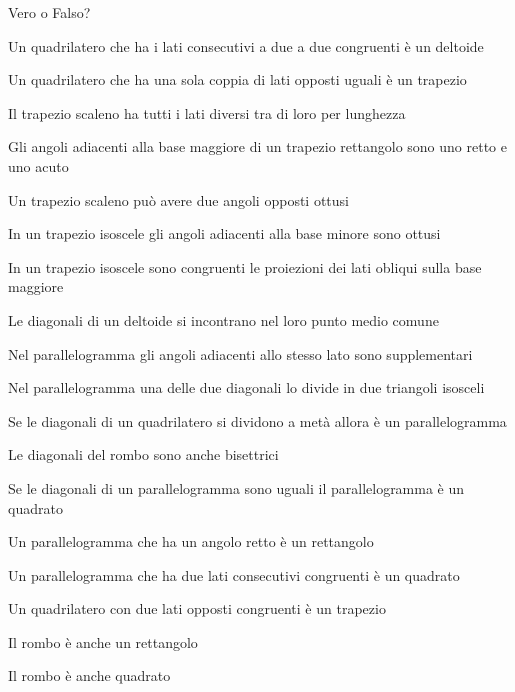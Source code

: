 \begin{esercizio}
\label{ese:4.2}
Vero o Falso?
\begin{enumeratea}
\item Un quadrilatero che ha i lati consecutivi a due a due 
congruenti è un deltoide\hfill\boxV\quad\boxF
\item Un quadrilatero che ha una sola coppia di lati opposti uguali è 
un trapezio\hfill\boxV\quad\boxF
\item Il trapezio scaleno ha tutti i lati diversi tra di loro per 
lunghezza\hfill\boxV\quad\boxF
\item Gli angoli adiacenti alla base maggiore di un trapezio 
rettangolo sono uno retto e uno acuto\hfill\boxV\quad\boxF
\item Un trapezio scaleno può avere due angoli opposti 
ottusi\hfill\boxV\quad\boxF
\item In un trapezio isoscele gli angoli adiacenti alla base minore 
sono ottusi\hfill\boxV\quad\boxF
\item In un trapezio isoscele sono congruenti le proiezioni dei lati 
obliqui sulla base maggiore\tab\hfill\boxV\quad\boxF
\item Le diagonali di un deltoide si incontrano nel loro punto medio 
comune\hfill\boxV\quad\boxF
\item Nel parallelogramma gli angoli adiacenti allo stesso lato sono 
supplementari\hfill\boxV\quad\boxF
\item Nel parallelogramma una delle due diagonali lo divide in due 
triangoli isosceli\tab\tab\tab\hfill\boxV\quad\boxF
\item Se le diagonali di un quadrilatero si dividono a metà allora è 
un parallelogramma\tab\tab\hfill\boxV\quad\boxF
\item Le diagonali del rombo sono anche 
bisettrici\hfill\boxV\quad\boxF
\item Se le diagonali di un parallelogramma sono uguali il 
parallelogramma è un quadrato\tab\tab\hfill\boxV\quad\boxF
\item Un parallelogramma che ha un angolo retto è un 
rettangolo\hfill\boxV\quad\boxF
\item Un parallelogramma che ha due lati consecutivi congruenti è un 
quadrato\hfill\boxV\quad\boxF
\item Un quadrilatero con due lati opposti congruenti è un 
trapezio\hfill\boxV\quad\boxF
\item Il rombo è anche un rettangolo\hfill\boxV\quad\boxF
\item Il rombo è anche quadrato\hfill\boxV\quad\boxF

\end{enumeratea}
\end{esercizio}
